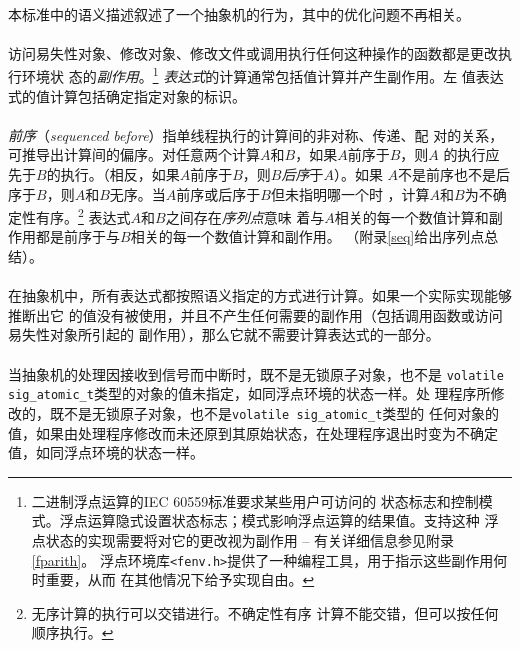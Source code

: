\paragraph{}
本标准中的语义描述叙述了一个抽象机的行为，其中的优化问题不再相关。

\paragraph{}
访问易失性对象、修改对象、修改文件或调用执行任何这种操作的函数都是更改执行环境状
态的\textit{副作用}。\footnote{二进制浮点运算的IEC 60559标准要求某些用户可访问的
状态标志和控制模式。浮点运算隐式设置状态标志；模式影响浮点运算的结果值。支持这种
浮点状态的实现需要将对它的更改视为副作用 -- 有关详细信息参见附录\ref{fparith}。
浮点环境库\texttt{<fenv.h>}提供了一种编程工具，用于指示这些副作用何时重要，从而
在其他情况下给予实现自由。} \textit{表达式}的计算通常包括值计算并产生副作用。左
值表达式的值计算包括确定指定对象的标识。

\paragraph{}
\textit{前序}（\textit{sequenced before}）指单线程执行的计算间的非对称、传递、配
对的关系，可推导出计算间的偏序。对任意两个计算$A$和$B$，如果$A$前序于$B$，则$A$
的执行应先于$B$的执行。（相反，如果$A$前序于$B$，则$B$\textit{后序}于$A$）。如果
$A$不是前序也不是后序于$B$，则$A$和$B$无序。当$A$前序或后序于$B$但未指明哪一个时
，计算$A$和$B$为不确定性有序。\footnote{无序计算的执行可以交错进行。不确定性有序
计算不能交错，但可以按任何顺序执行。} 表达式$A$和$B$之间存在\textit{序列点}意味
着与$A$相关的每一个数值计算和副作用都是前序于与$B$相关的每一个数值计算和副作用。
（附录\ref{seq}给出序列点总结）。

\paragraph{}
在抽象机中，所有表达式都按照语义指定的方式进行计算。如果一个实际实现能够推断出它
的值没有被使用，并且不产生任何需要的副作用（包括调用函数或访问易失性对象所引起的
副作用），那么它就不需要计算表达式的一部分。

\paragraph{}
当抽象机的处理因接收到信号而中断时，既不是无锁原子对象，也不是
\texttt{volatile sig\_atomic\_t}类型的对象的值未指定，如同浮点环境的状态一样。处
理程序所修改的，既不是无锁原子对象，也不是\texttt{volatile sig\_atomic\_t}类型的
任何对象的值，如果由处理程序修改而未还原到其原始状态，在处理程序退出时变为不确定
值，如同浮点环境的状态一样。

